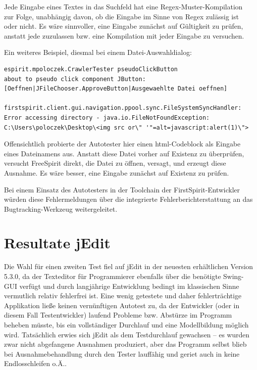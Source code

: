 Jede Eingabe eines Textes in das Suchfeld hat eine Regex-Muster-Kompilation
zur Folge, unabhängig davon, ob die Eingabe im Sinne von Regex zulässig ist
oder nicht. Es wäre sinnvoller, eine Eingabe zunächst auf Gültigkeit zu prüfen,
anstatt jede zuzulassen bzw. eine Kompilation mit jeder Eingabe zu versuchen.

Ein weiteres Beispiel, diesmal bei einem Datei-Auswahldialog:

\begin{lstlisting}[float=!ht,label=fmjson,caption={Ausnahme bei ungültiger Dateiangabe}]
espirit.mpoloczek.CrawlerTester pseudoClickButton
about to pseudo click component JButton:
[Oeffnen|JFileChooser.ApproveButton|Ausgewaehlte Datei oeffnen]

firstspirit.client.gui.navigation.ppool.sync.FileSystemSyncHandler:
Error accessing directory - java.io.FileNotFoundException:
C:\Users\poloczek\Desktop\<img src or\" '"=alt=javascript:alert(1)\">
\end{lstlisting}

Offensichtlich probierte der Autotester hier einen html-Codeblock als Eingabe eines Dateinamens
aus. Anstatt diese Datei vorher auf Existenz zu überprüfen, versucht FreeSpirit direkt,
die Datei zu öffnen, versagt, und erzeugt diese Ausnahme. Es wäre besser, eine
Eingabe zunächst auf Existenz zu prüfen.

Bei einem Einsatz des Autotesters in der Toolchain
der FirstSpirit-Entwickler würden diese
Fehlermeldungen über die integrierte Fehlerberichterstattung
an das Bugtracking-Werkzeug weitergeleitet.


\section{Resultate jEdit}\label{section:testresultsjedit}

Die Wahl für einen zweiten Test fiel auf jEdit
in der neuesten erhältlichen Version 5.3.0,
da der \glqq{}Texteditor für Programmierer\grqq{}
ebenfalls über die benötigte Swing-GUI verfügt und 
durch langjährige Entwicklung bedingt im klassischen
Sinne vermutlich relativ fehlerfrei ist. Eine wenig getestete und daher fehlerträchtige
Applikation ließe keinen vernünftigen Autotest zu, da der Entwickler (oder in diesem Fall
Testentwickler) laufend Probleme bzw. Abstürze im Programm beheben müsste, bis ein vollständiger
Durchlauf und eine Modellbildung möglich wird. Tatsächlich erwies sich jEdit als
dem Testdurchlauf gewachsen -- es wurden zwar nicht abgefangene Ausnahmen produziert,
aber das Programm selbst blieb bei Ausnahmebehandlung durch den Tester lauffähig
und geriet auch in keine Endlosschleifen o.Ä..



